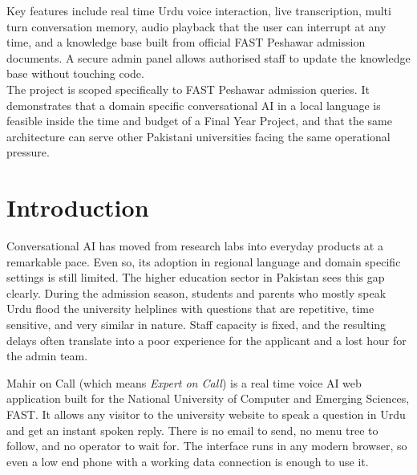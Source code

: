 \documentclass[12pt,a4paper]{report}
\begin{document}
\noindent Key features include real time Urdu voice interaction, live
transcription, multi turn conversation memory, audio playback that the user
can interrupt at any time, and a knowledge base built from official
FAST Peshawar admission documents. A secure admin panel allows authorised
staff to update the knowledge base without touching code.\\[0.3cm]

\noindent The project is scoped specifically to FAST Peshawar admission
queries. It demonstrates that a domain specific conversational AI in a local
language is feasible inside the time and budget of a Final Year Project, and
that the same architecture can serve other Pakistani universities facing the
same operational pressure.

\newpage
\tableofcontents

\newpage
{}
\setcounter{page}{1}

\newpage
\section{Introduction}

Conversational AI has moved from research labs into everyday products at a
remarkable pace. Even so, its adoption in regional language and domain
specific settings is still limited. The higher education sector in Pakistan
sees this gap clearly. During the admission season, students and parents who
mostly speak Urdu flood the university helplines with questions that are
repetitive, time sensitive, and very similar in nature. Staff capacity is
fixed, and the resulting delays often translate into a poor experience for
the applicant and a lost hour for the admin team.

Mahir on Call (which means \textit{Expert on Call}) is a real time voice AI
web application built for the National University of Computer and Emerging
Sciences, FAST. It allows any visitor to the university website to speak a
question in Urdu and get an instant spoken reply. There is no email to
send, no menu tree to follow, and no operator to wait for. The interface
runs in any modern browser, so even a low end phone with a working data
connection is enough to use it.
\end{document}
